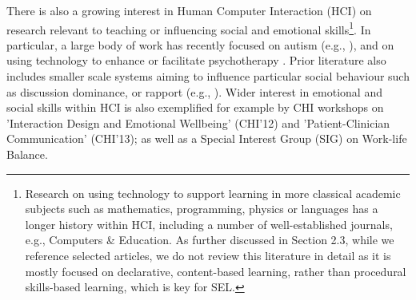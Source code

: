 \documentclass[prodmode,acmtochi]{acmsmall}
\begin{document}

There is also a growing interest in Human Computer Interaction (HCI) on research relevant to teaching or influencing social and emotional skills\footnote{Research on using technology to support learning in more classical academic subjects such as mathematics, programming, physics or languages  has a longer history within HCI, including a number of well-established journals, e.g., Computers \& Education. As further discussed in Section 2.3, while we reference selected articles, we do not review this literature in detail as it is mostly focused on declarative, content-based learning, rather than procedural skills-based learning, which is key for SEL.}. In particular, a large body of work has recently focused on autism (e.g., \cite{Escobedo2012,Porayska-Pomsta2011,Zarin2011,Tentori2010,Gotsis2010,Hong2012}), and on using technology to enhance or facilitate psychotherapy \cite{Coyle2011,Matthews2011,DeSa2010,Hancock2010}. Prior literature also includes smaller scale systems aiming to influence particular social behaviour such as discussion dominance, or rapport (e.g., \cite{Narumi2009,Piper2006,Balaam2011,Kim2008,McAtamney2006,Schroyen2008,Kim2008a,Toups2007,Kreitmayer2012,Daily2010,Munson2010}). 
%
%
Wider interest in emotional and social skills within HCI is also exemplified for example by CHI workshops on 'Interaction Design and Emotional Wellbeing' (CHI'12) and 'Patient-Clinician Communication' (CHI'13); as well as a Special Interest Group (SIG) on Work-life Balance. 

        

\end{document}
